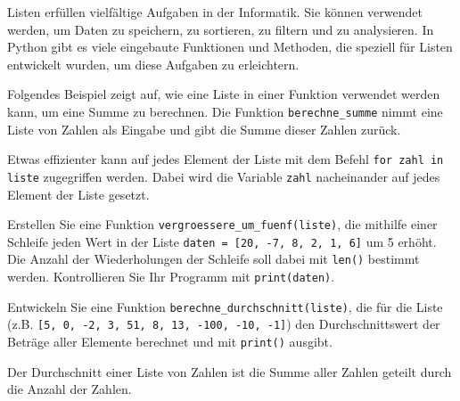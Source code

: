 Listen erfüllen vielfältige Aufgaben in der Informatik. Sie können verwendet werden, um Daten zu speichern, zu sortieren, zu filtern und zu analysieren. In Python gibt es viele eingebaute Funktionen und Methoden, die speziell für Listen entwickelt wurden, um diese Aufgaben zu erleichtern.
\begin{myexample}
Folgendes Beispiel zeigt auf, wie eine Liste in einer Funktion verwendet werden kann, um eine Summe zu berechnen. Die Funktion \lstinline|berechne_summe| nimmt eine Liste von Zahlen als Eingabe und gibt die Summe dieser Zahlen zurück.

\end{myexample}

\begin{myexample}
Etwas effizienter kann auf jedes Element der Liste mit dem Befehl \lstinline|for zahl in liste| zugegriffen werden. Dabei wird die Variable \lstinline|zahl| nacheinander auf jedes Element der Liste gesetzt.

\end{myexample}

\begin{myexercise}
	Erstellen Sie eine Funktion \lstinline|vergroessere_um_fuenf(liste)|, die mithilfe einer Schleife jeden Wert in der Liste \lstinline|daten = [20, -7, 8, 2, 1, 6]| um 5 erhöht. Die Anzahl der Wiederholungen der Schleife soll dabei mit \lstinline|len()| bestimmt werden. Kontrollieren Sie Ihr Programm mit \lstinline|print(daten)|.

	\begin{myanswer}
		
	\end{myanswer}
\end{myexercise}

\begin{myexercise}
	Entwickeln Sie eine Funktion \lstinline|berechne_durchschnitt(liste)|, die für die Liste (z.B. \lstinline|[5, 0, -2, 3, 51, 8, 13, -100, -10, -1]|) den Durchschnittswert der Beträge aller Elemente berechnet und mit \lstinline|print()| ausgibt.

	Der Durchschnitt einer Liste von Zahlen ist die Summe aller Zahlen geteilt durch die Anzahl der Zahlen.
	\begin{myanswer}
		
	\end{myanswer}
\end{myexercise}

